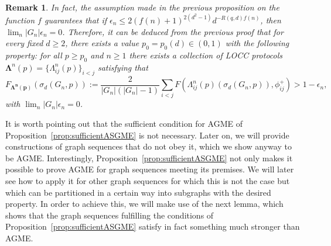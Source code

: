 \documentclass[a4paper,onecolumn,accepted=2024-12-14]{quantumarticle}
\newtheorem{remark}[theorem]{Remark}%
\theoremstyle{plain}
\begin{document}
\begin{remark}\label{Remark:sufficientASGME}
In fact, the assumption made in the previous proposition on the function $f$ guarantees that if $\epsilon_n\leq2(f(n)+1)^{2(d^2-1)}d^{-R(q,d)f(n)}$, then $\lim_n |G_n|\epsilon_n=0$. Therefore, it can be deduced from the previous proof that for every fixed $d\geq 2$, there exists a value $p_0=p_0(d)\in (0,1)$ with the following property: for all $p\geq p_0$ and $n\geq 1$ there exists a collection of LOCC protocols
$\mathbf{\Lambda}^n(p)=\{\Lambda_{ij}^n(p)\}_{i<j}$ satisfying that
\begin{equation}
F_\mathbf{\mathbf{\Lambda}^n(p)}(\sigma_d(G_n,p)):=\frac{2}{|G_n|(|G_n|-1)}\sum_{i<j}
F\left(\Lambda_{ij}^n(p)(\sigma_d(G_n,p)),\phi_{ij}^{+}\right)> 1-\epsilon_n,
\end{equation}with $\lim_n |G_n|\epsilon_n=0$.
\end{remark}



It is worth pointing out that the sufficient condition for AGME of Proposition~\ref{prop:sufficientASGME} is not necessary. Later on, we will provide constructions of graph sequences that do not obey it, which we show anyway to be AGME. Interestingly, Proposition~\ref{prop:sufficientASGME} not only makes it possible to prove AGME for graph sequences meeting its premises. We will later see how to apply it for other graph sequences for which this is not the case but which can be partitioned in a certain way into subgraphs with the desired property. In order to achieve this, we will make use of the next lemma, which shows that the graph sequences fulfilling the conditions of
Proposition~\ref{prop:sufficientASGME} satisfy in fact something much stronger than AGME.
\end{document}
